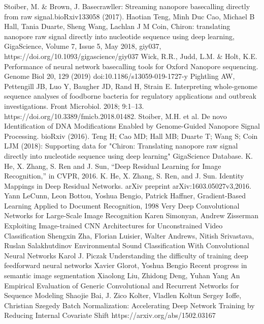 \documentclass[a4paper,11pt,twoside]{report}
\theoremstyle{definition}
\begin{document}
\begin{thebibliography}{20}
Stoiber, M. \& Brown, J. Basecrawller: Streaming nanopore basecalling directly from raw signal.bioRxiv133058 (2017).
 Haotian Teng, Minh Duc Cao, Michael B Hall, Tania Duarte, Sheng Wang, Lachlan J M Coin, Chiron: translating nanopore raw signal directly into nucleotide sequence using deep learning, GigaScience, Volume 7, Issue 5, May 2018, giy037, https://doi.org/10.1093/gigascience/giy037
Wick, R.R., Judd, L.M. \& Holt, K.E. Performance of neural network basecalling tools for Oxford Nanopore sequencing. Genome Biol 20, 129 (2019) doi:10.1186/s13059-019-1727-y
Pightling AW, Pettengill JB, Luo Y, Baugher JD, Rand H, Strain E. Interpreting whole-genome sequence analyses of foodborne bacteria for regulatory applications and outbreak investigations. Front Microbiol. 2018; 9:1–13. https://doi.org/10.3389/fmicb.2018.01482.
Stoiber, M.H. et al. De novo Identification of DNA Modifications Enabled by Genome-Guided Nanopore Signal Processing. bioRxiv (2016).
 Teng H; Cao MD; Hall MB; Duarte T; Wang S; Coin LJM (2018): Supporting data for "Chiron: Translating nanopore raw signal directly into nucleotide sequence using deep learning" GigaScience Database.
 K. He, X. Zhang, S. Ren and J. Sun, “Deep Residual Learning for Image Recognition,” in CVPR, 2016.
K. He, X. Zhang, S. Ren, and J. Sun. Identity Mappings in Deep Residual Networks. arXiv preprint arXiv:1603.05027v3,2016.
Yann LeCunn, Leon Bottou, Yoshua Bengio, Patrick Haffner, Gradient-Based Learning Applied to Document Recognition, 1998
Very Deep Convolutional Networks for Large-Scale Image Recognition Karen Simonyan, Andrew Zisserman
 Exploiting Image-trained CNN Architectures for Unconstrained Video Classification Shengxin Zha, Florian Luisier, Walter Andrews, Nitish Srivastava, Ruslan Salakhutdinov
 Environmental Sound Classification With Convolutional Neural Networks Karol J. Piczak
Understanding the difficulty of training deep feedforward neural networks Xavier Glorot, Yoshua Bengio
 Recent progress in semantic image segmentation Xiaolong Liu, Zhidong Deng, Yuhan Yang
 An Empirical Evaluation of Generic Convolutional and Recurrent Networks for Sequence Modeling Shaojie Bai, J. Zico Kolter, Vladlen Koltun
Sergey Ioffe, Christian Szegedy Batch Normalization: Accelerating Deep Network Training by Reducing Internal Covariate Shift https://arxiv.org/abs/1502.03167

\end{thebibliography}
\end{document}

